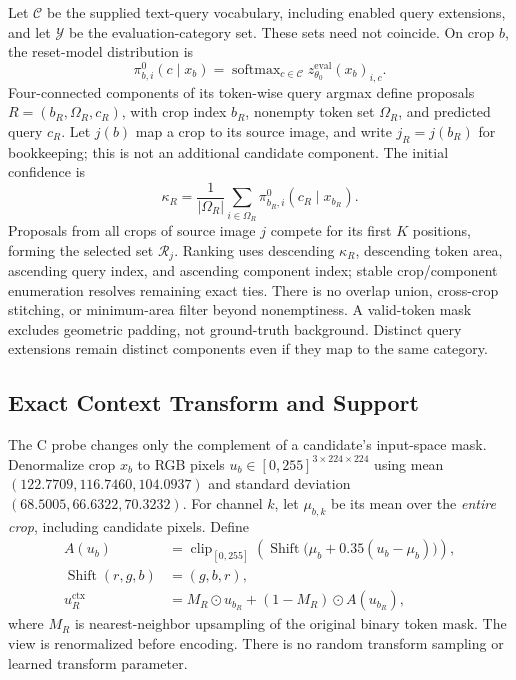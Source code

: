 Let $\mathcal C$ be the supplied text-query vocabulary, including enabled query extensions, and let $\mathcal Y$ be the evaluation-category set. These sets need not coincide. On crop $b$, the reset-model distribution is
\begin{equation}
\pi^0_{b,i}(c\mid x_b)=
\operatorname{softmax}_{c\in\mathcal C}
z^{\mathrm{eval}}_{\theta_0}(x_b)_{i,c}.
\end{equation}
Four-connected components of its token-wise query argmax define proposals $R=(b_R,\Omega_R,c_R)$, with crop index $b_R$, nonempty token set $\Omega_R$, and predicted query $c_R$. Let $j(b)$ map a crop to its source image, and write $j_R=j(b_R)$ for bookkeeping; this is not an additional candidate component. The initial confidence is
\begin{equation}
\kappa_R=\frac{1}{|\Omega_R|}\sum_{i\in\Omega_R}
\pi^0_{b_R,i}(c_R\mid x_{b_R}).
\end{equation}
Proposals from all crops of source image $j$ compete for its first $K$ positions, forming the selected set $\mathcal R_j$. Ranking uses descending $\kappa_R$, descending token area, ascending query index, and ascending component index; stable crop/component enumeration resolves remaining exact ties. There is no overlap union, cross-crop stitching, or minimum-area filter beyond nonemptiness. A valid-token mask excludes geometric padding, not ground-truth background. Distinct query extensions remain distinct components even if they map to the same category.

\subsection{Exact Context Transform and Support}
The C probe changes only the complement of a candidate's input-space mask. Denormalize crop $x_b$ to RGB pixels $u_b\in[0,255]^{3\times224\times224}$ using mean $(122.7709,116.7460,104.0937)$ and standard deviation $(68.5005,66.6322,70.3232)$. For channel $k$, let $\mu_{b,k}$ be its mean over the \emph{entire crop}, including candidate pixels. Define
\begin{align}
A(u_b)&=\operatorname{clip}_{[0,255]}
\left(\operatorname{Shift}\bigl(\mu_b+0.35(u_b-\mu_b)\bigr)\right),\\
\operatorname{Shift}(r,g,b)&=(g,b,r),\\
u_R^{\mathrm{ctx}}&=M_R\odot u_{b_R}
 +(1-M_R)\odot A(u_{b_R}),
\end{align}
where $M_R$ is nearest-neighbor upsampling of the original binary token mask. The view is renormalized before encoding. There is no random transform sampling or learned transform parameter.


